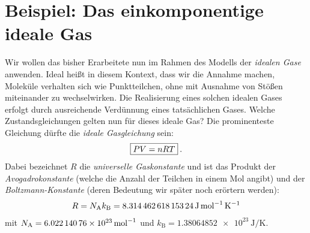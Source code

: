\section{Beispiel: Das einkomponentige ideale Gas}
Wir wollen das bisher Erarbeitete nun im Rahmen des Modells der \emph{idealen Gase} anwenden. Ideal heißt in diesem Kontext, dass wir die Annahme machen, Moleküle verhalten sich wie Punktteilchen, ohne \textendash{} mit Ausnahme von Stößen \textendash{} miteinander zu wechselwirken. Die Realisierung eines solchen idealen Gases erfolgt durch ausreichende Verdünnung eines tatsächlichen Gases.
Welche Zustandsgleichungen gelten nun für dieses ideale Gas?
Die prominenteste Gleichung dürfte die \emph{ideale Gasgleichung} sein:
\begin{align*}
    \boxed{PV=n RT}\:.
\end{align*}
Dabei bezeichnet $R$ die \emph{universelle Gaskonstante} und ist das Produkt der \emph{Avogadrokonstante} (welche die Anzahl der Teilchen in einem Mol angibt) und der \emph{Boltzmann-Konstante} (deren Bedeutung wir später noch erörtern werden):
\begin{align*}
    R=N_\mathrm{A} k_\mathrm{B}=\qty{ 8,314 462 618 153 24}{\joule\per\mole\per\kelvin}
\end{align*}
mit $N_\mathrm{A}=\qty{6,02214076e23}{\per\mole}$ und $k_\mathrm{B}=\qty{1,38064852e23}{\joule\per\kelvin}$. 

